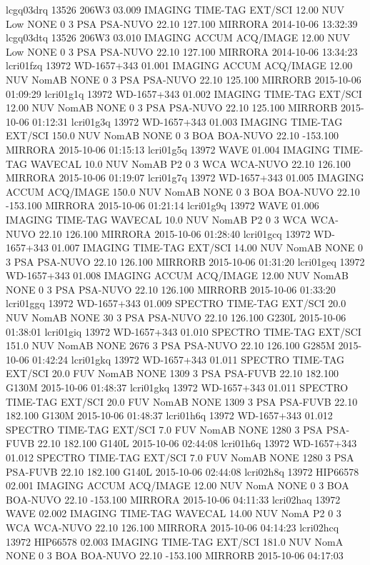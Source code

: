 lcgq03drq 13526 206W3 03.009 IMAGING TIME-TAG EXT/SCI 12.00 NUV Low NONE 0 3 PSA PSA-NUVO 22.10 127.100 MIRRORA 2014-10-06 13:32:39
lcgq03dtq 13526 206W3 03.010 IMAGING ACCUM ACQ/IMAGE 12.00 NUV Low NONE 0 3 PSA PSA-NUVO 22.10 127.100 MIRRORA 2014-10-06 13:34:23
lcri01fzq 13972 WD-1657+343 01.001 IMAGING ACCUM ACQ/IMAGE 12.00 NUV NomAB NONE 0 3 PSA PSA-NUVO 22.10 125.100 MIRRORB 2015-10-06 01:09:29
lcri01g1q 13972 WD-1657+343 01.002 IMAGING TIME-TAG EXT/SCI 12.00 NUV NomAB NONE 0 3 PSA PSA-NUVO 22.10 125.100 MIRRORB 2015-10-06 01:12:31
lcri01g3q 13972 WD-1657+343 01.003 IMAGING TIME-TAG EXT/SCI 150.0 NUV NomAB NONE 0 3 BOA BOA-NUVO 22.10 -153.100 MIRRORA 2015-10-06 01:15:13
lcri01g5q 13972 WAVE 01.004 IMAGING TIME-TAG WAVECAL 10.0 NUV NomAB P2 0 3 WCA WCA-NUVO 22.10 126.100 MIRRORA 2015-10-06 01:19:07
lcri01g7q 13972 WD-1657+343 01.005 IMAGING ACCUM ACQ/IMAGE 150.0 NUV NomAB NONE 0 3 BOA BOA-NUVO 22.10 -153.100 MIRRORA 2015-10-06 01:21:14
lcri01g9q 13972 WAVE 01.006 IMAGING TIME-TAG WAVECAL 10.0 NUV NomAB P2 0 3 WCA WCA-NUVO 22.10 126.100 MIRRORA 2015-10-06 01:28:40
lcri01gcq 13972 WD-1657+343 01.007 IMAGING TIME-TAG EXT/SCI 14.00 NUV NomAB NONE 0 3 PSA PSA-NUVO 22.10 126.100 MIRRORB 2015-10-06 01:31:20
lcri01geq 13972 WD-1657+343 01.008 IMAGING ACCUM ACQ/IMAGE 12.00 NUV NomAB NONE 0 3 PSA PSA-NUVO 22.10 126.100 MIRRORB 2015-10-06 01:33:20
lcri01ggq 13972 WD-1657+343 01.009 SPECTRO TIME-TAG EXT/SCI 20.0 NUV NomAB NONE 30 3 PSA PSA-NUVO 22.10 126.100 G230L 2015-10-06 01:38:01
lcri01giq 13972 WD-1657+343 01.010 SPECTRO TIME-TAG EXT/SCI 151.0 NUV NomAB NONE 2676 3 PSA PSA-NUVO 22.10 126.100 G285M 2015-10-06 01:42:24
lcri01gkq 13972 WD-1657+343 01.011 SPECTRO TIME-TAG EXT/SCI 20.0 FUV NomAB NONE 1309 3 PSA PSA-FUVB 22.10 182.100 G130M 2015-10-06 01:48:37
lcri01gkq 13972 WD-1657+343 01.011 SPECTRO TIME-TAG EXT/SCI 20.0 FUV NomAB NONE 1309 3 PSA PSA-FUVB 22.10 182.100 G130M 2015-10-06 01:48:37
lcri01h6q 13972 WD-1657+343 01.012 SPECTRO TIME-TAG EXT/SCI 7.0 FUV NomAB NONE 1280 3 PSA PSA-FUVB 22.10 182.100 G140L 2015-10-06 02:44:08
lcri01h6q 13972 WD-1657+343 01.012 SPECTRO TIME-TAG EXT/SCI 7.0 FUV NomAB NONE 1280 3 PSA PSA-FUVB 22.10 182.100 G140L 2015-10-06 02:44:08
lcri02h8q 13972 HIP66578 02.001 IMAGING ACCUM ACQ/IMAGE 12.00 NUV NomA NONE 0 3 BOA BOA-NUVO 22.10 -153.100 MIRRORA 2015-10-06 04:11:33
lcri02haq 13972 WAVE 02.002 IMAGING TIME-TAG WAVECAL 14.00 NUV NomA P2 0 3 WCA WCA-NUVO 22.10 126.100 MIRRORA 2015-10-06 04:14:23
lcri02hcq 13972 HIP66578 02.003 IMAGING TIME-TAG EXT/SCI 181.0 NUV NomA NONE 0 3 BOA BOA-NUVO 22.10 -153.100 MIRRORB 2015-10-06 04:17:03
